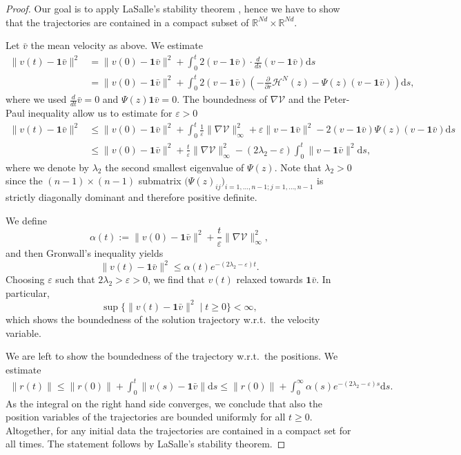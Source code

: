 \documentclass[11pt]{article}
\newcommand{\R}[0]{\mathbb R}
\newcommand{\dd}[0]{\mathrm d}
\begin{document}
\begin{bibunit}[abbrv]
\begin{proof}
Our goal is to apply LaSalle's stability theorem \cite[Theorem 3.2.11]{HiPr},  hence we have to show that the trajectories are contained in a compact subset of $\R^{Nd}\times \R^{Nd}$. 

Let $\bar v$ the mean velocity as above. We estimate
\begin{align*}
\| v(t) - \textbf{1}\bar v \|^2 &= \| v(0) - \textbf{1} \bar v\|^2 + \int_0^t 2 (v- \textbf{1}\bar v) \cdot \frac{d}{ds} (v- \textbf{1}\bar v) \dd s \\
&= \| v(0) - \textbf{1} \bar v\|^2 + \int_0^t 2 (v - \textbf{1}\bar v) (-\frac{\partial}{\partial r} \mathcal H^N(z) - \Psi(z) (v - \textbf{1}\bar v)) \dd s,
\end{align*}
where we used $\frac{d}{dt} \bar v = 0$ and $\Psi(z)\textbf{1}\bar v =0$. The boundedness of $\nabla \mathcal V$ and the Peter-Paul inequality allow us to estimate for $\varepsilon>0$
\begin{align*}
\| v(t) - \textbf{1}\bar v \|^2 &\le \| v(0) - \textbf{1} \bar v\|^2 + \int_0^t \frac{1}{\varepsilon} \| \nabla \mathcal V\|_\infty^2 +  \varepsilon \| v - \textbf{1}\bar v \|^2 - 2(v - \textbf{1}\bar v) \Psi(z)(v - \textbf{1}\bar v) \dd s \\
&\le  \| v(0) - \textbf{1} \bar v\|^2 +  \frac{t}{\varepsilon}  \| \nabla \mathcal V\|_\infty^2 - (2\lambda_2 - \varepsilon) \int_0^t \| v - \textbf{1}\bar v\|^2 \dd s,
\end{align*}
where we denote by $\lambda_2$ the second smallest eigenvalue of $\Psi(z)$. Note that $\lambda_2 >0$ since the $(n-1) \times (n-1)$ submatrix $\big(\Psi(z)_{ij}\big)_{i=1,\dots, n-1;j=1,\dots,n-1}$ is strictly diagonally dominant and therefore positive definite.

We define 
$$\alpha(t):= \| v(0) - \textbf{1} \bar v\|^2 +  \frac{t}{\varepsilon}   \| \nabla \mathcal V\|_\infty^2,$$
and then  Gronwall's inequality yields 
\[ \| v(t) - \textbf{1}\bar v \|^2  \le \alpha(t) e^{- (2\lambda_2 - \varepsilon)t}.\] 
Choosing $\varepsilon$ such that $2\lambda_2 > \varepsilon > 0$, we find that $v(t)$ relaxed towards $\textbf{1}\bar v$. In particular, $$\sup \{\| v(t) - \textbf{1}\bar v\|^2\mid t\ge 0\}<\infty,$$
which shows the boundedness of the solution trajectory w.r.t.~the velocity variable. 

We are left to show the boundedness of the trajectory w.r.t.~the positions. We estimate
\begin{align*}
\| r(t) \| \le \| r(0) \| + \int_0^t \|v(s) - \textbf{1}\bar v \| \dd s 
\le \| r(0) \| +  \int_0^\infty \alpha(s) e^{- (2\lambda_2 - \varepsilon)s}\dd s. 
\end{align*}
As the integral on the right hand side converges, we 
 conclude that also the position variables of the trajectories are bounded uniformly for all $t\ge 0$. Altogether, for any initial data the trajectories are contained in a compact set for all times. The statement follows by LaSalle's stability theorem.
\end{proof}



\end{bibunit}
\end{document}
